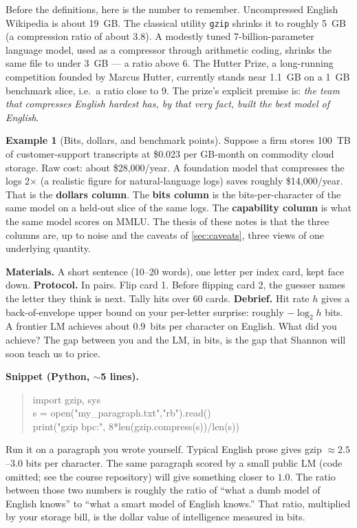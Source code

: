 \documentclass[12pt,a4paper]{article}
\theoremstyle{plain}
\theoremstyle{definition}
\newtheorem{example}[theorem]{Example}
\begin{document}
Before the definitions, here is the number to remember.
Uncompressed English Wikipedia is about 19~GB. The classical utility
\texttt{gzip} shrinks it to roughly 5~GB (a compression ratio of
about 3.8). A modestly tuned 7-billion-parameter language model, used
as a compressor through arithmetic coding, shrinks the same file to
under 3~GB --- a ratio above 6. The Hutter Prize, a long-running
competition founded by Marcus Hutter, currently stands near 1.1~GB
on a 1~GB benchmark slice, i.e.\ a ratio close to 9. The prize's
explicit premise is: \emph{the team that compresses English hardest
has, by that very fact, built the best model of English}.
\citep{hutter2005universal}

\begin{example}[Bits, dollars, and benchmark points]
\label{ex:three-currencies}
Suppose a firm stores 100~TB of customer-support transcripts at
\$0.023 per GB-month on commodity cloud storage. Raw cost:
about \$28{,}000/year. A foundation model that compresses the logs
2$\times$ (a realistic figure for natural-language logs) saves
roughly \$14{,}000/year. That is the \textbf{dollars column}.
The \textbf{bits column} is the bits-per-character of the same
model on a held-out slice of the same logs. The \textbf{capability
column} is what the same model scores on MMLU. The thesis of these
notes is that the three columns are, up to noise and the caveats of
\cref{sec:caveats}, three views of one underlying quantity.
\end{example}

\begin{activity}[title={Activity A1 --- Guess the next letter}]
\textbf{Materials.} A short sentence (10--20 words), one letter per
index card, kept face down.
\textbf{Protocol.} In pairs. Flip card 1. Before flipping card 2,
the guesser names the letter they think is next. Tally hits over 60
cards.
\textbf{Debrief.} Hit rate $h$ gives a back-of-envelope upper bound
on your per-letter surprise: roughly $-\log_2 h$ bits. A frontier LM
achieves about 0.9~bits per character on English. What did you
achieve? The gap between you and the LM, in bits, is the gap that
Shannon will soon teach us to price.
\end{activity}

\begin{activity}[title={Activity A2 --- Compress your own paragraph}]
\textbf{Snippet (Python, $\sim$5 lines).}
\begin{quote}\small\ttfamily
import gzip, sys\\
s = open("my\_paragraph.txt","rb").read()\\
print("gzip bpc:", 8*len(gzip.compress(s))/len(s))
\end{quote}
Run it on a paragraph you wrote yourself. Typical English prose
gives gzip $\approx 2.5$--$3.0$ bits per character. The same
paragraph scored by a small public LM (code omitted; see the course
repository) will give something closer to $1.0$. The ratio between
those two numbers is roughly the ratio of ``what a dumb model of
English knows'' to ``what a smart model of English knows.'' That
ratio, multiplied by your storage bill, is the dollar value of
intelligence measured in bits.
\end{activity}
\end{document}

